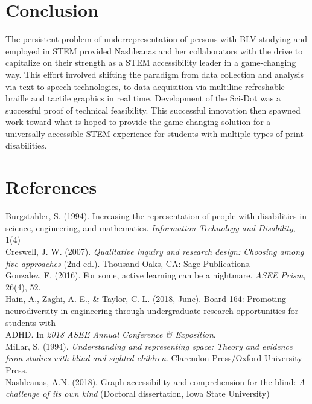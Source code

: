 \documentclass[11.5pt]{sig-alternate}
\begin{document}
\begin{large}
\section*{Conclusion}
The persistent problem of underrepresentation of persons with BLV studying and employed in STEM provided Nashleanas and her collaborators with the drive to capitalize on their strength as a STEM accessibility leader in a game-changing way. This effort involved shifting the paradigm from data collection and analysis via text-to-speech technologies, to data acquisition via multiline refreshable braille and tactile graphics in real time. Development of the Sci-Dot was a successful proof of technical feasibility. This successful innovation then spawned work toward what is hoped to provide the game-changing solution for a universally accessible STEM experience for students with multiple types of print disabilities.

 
\section*{References}\par 

\leftskip 0.25in
\parindent -0.25in 

Burgstahler, S. (1994). Increasing the representation of people with disabilities in science, engineering, and mathematics. \textit{Information Technology and Disability}, 1(4)\\

Creswell, J. W. (2007).\textit{ Qualitative inquiry and research design: Choosing among five approaches} (2nd ed.). Thousand Oaks, CA: Sage Publications.\\

Gonzalez, F. (2016). For some, active learning can be a nightmare. \textit{ASEE Prism}, 26(4), 52.\\

Hain, A., Zaghi, A. E., \& Taylor, C. L. (2018, June). Board 164: Promoting neurodiversity in engineering through undergraduate research opportunities for students with \\ADHD. In \textit{2018 ASEE Annual Conference \& Exposition}.\\

Millar, S. (1994). \textit{Understanding and representing space: Theory and evidence from studies with blind and sighted children}. Clarendon Press/Oxford University Press.\\

Nashleanas, A.N.  (2018). Graph accessibility and comprehension for the blind: \textit{A challenge of its own kind} (Doctoral dissertation, Iowa State University)\\


\end{large}
\end{document}
